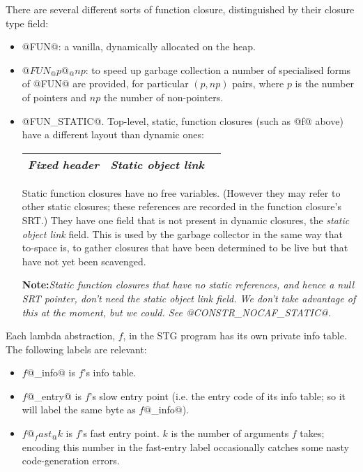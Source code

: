 \documentclass[11pt]{article}
\newcommand{\note}[1]{{{\bf Note:}\sl #1}}
\begin{document}
There are several different sorts of function closure, distinguished
by their closure type field:

\begin{itemize}

\item @FUN@: a vanilla, dynamically allocated on the heap.

\item $@FUN_@p@_@np$: to speed up garbage collection a number of
specialised forms of @FUN@ are provided, for particular $(p,np)$
pairs, where $p$ is the number of pointers and $np$ the number of
non-pointers.

\item @FUN_STATIC@.  Top-level, static, function closures (such as @f@
above) have a different layout than dynamic ones:

\begin{center}
\begin{tabular}{|l|l|l|}\hline
\emph{Fixed header}  & \emph{Static object link} \\ \hline
\end{tabular}
\end{center}

Static function closures have no free variables.  (However they may
refer to other static closures; these references are recorded in the
function closure's SRT.)  They have one field that is not present in
dynamic closures, the \emph{static object link} field.  This is used
by the garbage collector in the same way that to-space is, to gather
closures that have been determined to be live but that have not yet
been scavenged.

\note{Static function closures that have no static references, and
hence a null SRT pointer, don't need the static object link field.  We
don't take advantage of this at the moment, but we could.  See
@CONSTR\_NOCAF\_STATIC@.}  
\end{itemize}

Each lambda abstraction, $f$, in the STG program has its own private
info table.  The following labels are relevant:

\begin{itemize}

\item $f$@_info@  is $f$'s info table.

\item $f$@_entry@ is $f$'s slow entry point (i.e. the entry code of
its info table; so it will label the same byte as $f$@_info@).

\item $f@_fast_@k$ is $f$'s fast entry point.  $k$ is the number of
arguments $f$ takes; encoding this number in the fast-entry label
occasionally catches some nasty code-generation errors.

\end{itemize}
\end{document}
